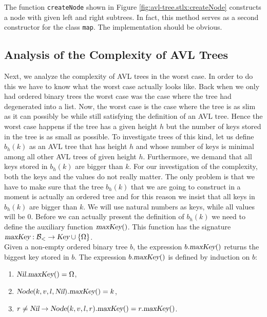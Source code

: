The function \texttt{createNode} shown in Figure \ref{fig:avl-tree.stlx:createNode}
constructs a node with given left and right subtrees.  In fact, this method serves as a second
constructor for the class \texttt{map}.  The implementation should be obvious.


\subsection{Analysis of the Complexity of AVL Trees}
Next, we analyze the complexity of AVL trees in the worst case.  In order to do this we have to know
what the worst case actually looks like.  Back when we only had ordered binary trees the worst case was the case where
the tree had degenerated into a list.  Now, the worst case is the case where the tree is as slim as
it can possibly be while still satisfying the definition of an AVL tree.  Hence the worst case
happens if the tree has a given height $h$ but the number of keys stored in the tree is as small as
possible.  To investigate trees of this kind, let us define  $b_h(k)$ as an AVL tree that has height
$h$ and whose number of keys is minimal among all other AVL trees of given  height $h$.  Furthermore,
we demand that all keys stored in  $b_h(k)$ are bigger than  $k$.  For our investigation of the
complexity, both the keys and the values do not really matter.  The only problem is that we have to
make sure that the tree $b_h(k)$ that we are going to construct in a moment is actually an ordered
tree and for this reason we insist that all keys in $b_h(k)$ are bigger than $k$.  We will use
natural numbers as keys, while all values will be $0$.
Before we can actually present the definition of  $b_h(k)$ we need to define the auxiliary function
 $\textsl{maxKey}()$.  This function has the signature 
\\[0.2cm]
\hspace*{1.3cm}
$\textsl{maxKey}:\mathcal{B}_< \rightarrow \textsl{Key} \cup \{ \Omega \}$.
\\[0.2cm]
Given a non-empty ordered binary tree  $b$, the expression $b.\textsl{maxKey}()$ returns the biggest
key stored in $b$.  The expression  $b.\textsl{maxKey}()$ is defined by induction on $b$:
\begin{enumerate}
\item $\textsl{Nil}.\textsl{maxKey}() = \Omega$,
\item $\textsl{Node}(k,v,l,\textsl{Nil}).\textsl{maxKey}() = k$,
\item $r \not= \textsl{Nil} \rightarrow \textsl{Node}(k,v,l,r).\textsl{maxKey}() = r.\textsl{maxKey}()$.
\end{enumerate}
